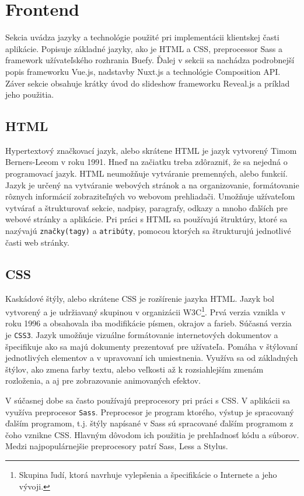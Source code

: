 \section{Frontend}
Sekcia uvádza jazyky a technológie použité pri implementácii klientskej časti aplikácie. Popisuje základné jazyky, ako je HTML a CSS, preprocessor Sass a framework užívateľského rozhrania Buefy. Ďalej v sekcii sa nachádza podrobnejší popis frameworku Vue.js, nadstavby Nuxt.js a technológie Composition API. Záver sekcie obsahuje krátky úvod do slideshow frameworku Reveal.js a príklad jeho použitia. 

\subsection{HTML}
Hypertextový značkovací jazyk\cite{html}, alebo skrátene HTML je jazyk vytvorený Timom Berners-Leeom v roku 1991. Hneď na začiatku treba zdôrazniť, že sa nejedná o programovací jazyk. HTML neumožňuje vytváranie premenných, alebo funkcií. Jazyk je určený na vytváranie webových stránok a na organizovanie, formátovanie rôznych informácií zobraziteľných vo webovom prehliadači. Umožňuje užívateľom vytvárať a štrukturovať sekcie, nadpisy, paragrafy, odkazy a mnoho ďalších pre webové stránky a aplikácie. Pri práci s HTML sa používajú štruktúry, ktoré sa nazývajú \texttt{značky(tagy)} a \texttt{atribúty}, pomocou ktorých sa štrukturujú jednotlivé časti web stránky. 

\subsection{CSS}
Kaskádové štýly\cite{css}, alebo skrátene CSS je rozšírenie jazyka HTML. Jazyk bol vytvorený a je udržiavaný skupinou v organizácii W3C\footnote{Skupina ľudí, ktorá navrhuje vylepšenia a špecifikácie o Internete a jeho vývoji.}.  Prvá verzia vznikla v roku 1996 a obsahovala iba modifikácie písmen, okrajov a farieb. Súčasná verzia je \texttt{CSS3}. Jazyk umožňuje vizuálne formátovanie internetových dokumentov a špecifikuje ako sa majú dokumenty prezentovať pre užívateľa. Pomáha v štýlovaní jednotlivých elementov a v upravovaní ich umiestnenia. Využíva sa od základných štýlov, ako zmena farby textu, alebo veľkosti až k rozsiahlejším zmenám rozloženia, a aj pre zobrazovanie animovaných efektov. 

V súčasnej dobe sa často používajú preprocesory pri práci s CSS. V aplikácii sa využíva preprocesor \texttt{Sass}. Preprocesor\cite{sass} je program ktorého, výstup je spracovaný ďalším programom, t.j. štýly napísané v Sass sú spracované ďalším programom z čoho vznikne CSS. Hlavným dôvodom ich použitia je prehľadnosť kódu a súborov. Medzi najpopulárnejšie preprocesory patrí Sass, Less a Stylus.

